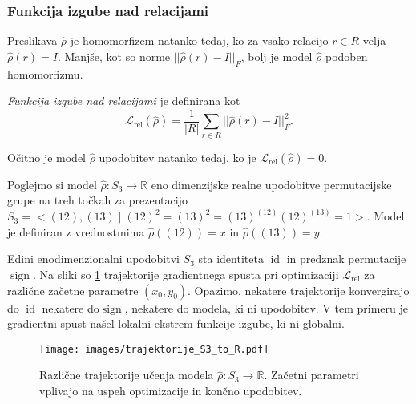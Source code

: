 \documentclass[mat2, tisk]{fmfdelo}
\newcommand{\R}{\mathbb R}
\newcommand{\Loss}[1]{\mathcal L _\text{#1}}
\begin{document}
    \subsubsection{Funkcija izgube nad relacijami}
    \label{funckija izgube nad relacijami}
    Preslikava $\hat \rho$ je homomorfizem natanko tedaj, ko za vsako relacijo $r \in R$ velja 
    $
    \hat \rho(r) = I 
    $. Manjše, kot so norme $||\hat \rho(r) - I ||_F$, bolj je model $\hat\rho$ podoben homomorfizmu. 
    \begin{definicija}
        \emph{Funkcija izgube nad relacijami} je definirana kot 
        \begin{equation}
            \label{eq:funkcija izgube nad relacijami            }
           \Loss{rel}(\hat\rho) = \frac{1}{|R|} \sum \limits_{r \in R}  ||\hat \rho(r) - I  ||_F^2.
        \end{equation}
    \end{definicija}
    Očitno je model $\hat \rho$ upodobitev natanko tedaj, ko je $ \Loss{rel}(\hat\rho) =0$.
    \begin{primer}
        Poglejmo si model $\hat \rho \colon S_3 \to \R$ eno dimenzijske realne upodobitve permutacijske grupe na treh točkah za prezentacijo $S_3 = <(12), (13)\mid (12)^2=(13)^2=(13)^{(12)}(12)^{(13)}=1>$. Model je definiran z vrednostmima 
        $\hat\rho((12)) = x$ in $\hat\rho((13)) = y$.

        Edini enodimenzionalni upodobitvi $S_3$ sta identiteta $\operatorname{id}$ in predznak permutacije $\operatorname{sign}$. Na sliki so  \ref{fig:trajektorije S3 to R} trajektorije gradientnega spusta pri optimizaciji $\Loss{rel}$ za različne začetne parametre $(x_0, y_0)$. Opazimo, nekatere trajektorije konvergirajo  do $\operatorname{id}$ nekatere do$\operatorname{sign}$, nekatere do modela, ki ni upodobitev. V tem primeru je gradientni spust našel lokalni ekstrem funkcije izgube, ki ni globalni.
        \begin{figure}[h]
  \centering
  \texttt{[image: images/trajektorije\_S3\_to\_R.pdf]}
  \caption[Trajektorje učenja modela $S_3 \to \R$.]{Različne trajektorije učenja modela $\hat\rho \colon S_3 \to \R$. Začetni parametri vplivajo na uspeh optimizacije in končno upodobitev. }
  \label{fig:trajektorije S3 to R}
\end{figure}
    \end{primer}
\end{document}
